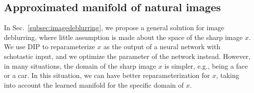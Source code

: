 \documentclass[final]{cvpr}
\newcommand{\Sref}[1]{Sec.~\ref{#1}}
\newcommand{\Aref}[1]{Algorithm~\ref{#1}}
\begin{document}
    
        
    
        
\subsection{Approximated manifold of natural images}
\label{subsec:restrictssolutionspace}


In \Sref{subsec:imagedeblurring}, we propose a general solution for image deblurring, where little assumption is made about the space of the sharp image $x$. We use DIP to reparameterize $x$ as the output of a neural network with schotastic input, and we optimize the parameter of the network instead. However, in many situations, the domain of the sharp image $x$ is simpler, e.g., being a face or a car. In this situation, we can have better reparameterization for $x$, taking into account the learned manifold for the specific domain of $x$. 
\end{document}
